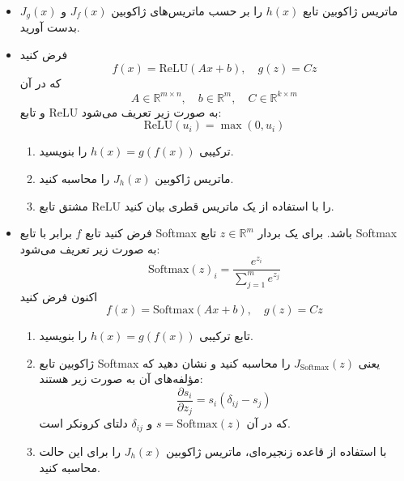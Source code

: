 \begin{itemize}
    \item[آ)] ماتریس ژاکوبین تابع $h(x)$ را بر حسب ماتریس‌های ژاکوبین $J_f(x)$ و $J_g(x)$ بدست آورید.
    
    \item[ب)] فرض کنید
    \begin{equation*}
        f(x) = \text{ReLU}(Ax + b), \quad g(z) = Cz
    \end{equation*}
    که در آن
    \begin{equation*}
        A \in \mathbb{R}^{m \times n}, \quad b \in \mathbb{R}^m, \quad C \in \mathbb{R}^{k \times m}
    \end{equation*}
    و تابع ReLU به صورت زیر تعریف می‌شود:
    \begin{equation*}
        \text{ReLU}(u_i) = \max(0, u_i)
    \end{equation*}
    \begin{enumerate}
        \item ترکیبی $h(x) = g(f(x))$ را بنویسید.
        \item ماتریس ژاکوبین $J_h(x)$ را محاسبه کنید.
        \item مشتق تابع ReLU را با استفاده از یک ماتریس قطری بیان کنید.
    \end{enumerate}

    \item[ج)] فرض کنید تابع $f$ برابر با تابع Softmax باشد. برای یک بردار $z \in \mathbb{R}^m$ تابع Softmax به صورت زیر تعریف می‌شود:
    \begin{equation*}
        \text{Softmax}(z)_i = \frac{e^{z_i}}{\sum_{j=1}^m e^{z_j}}
    \end{equation*}
    اکنون فرض کنید
    \begin{equation*}
        f(x) = \text{Softmax}(Ax + b), \quad g(z) = Cz
    \end{equation*}
    \begin{enumerate}
        \item تابع ترکیبی $h(x) = g(f(x))$ را بنویسید.
        \item ژاکوبین تابع Softmax یعنی $J_{\text{Softmax}}(z)$ را محاسبه کنید و نشان دهید که مؤلفه‌های آن به صورت زیر هستند:
        \begin{equation*}
            \frac{\partial s_i}{\partial z_j} = s_i(\delta_{ij} - s_j)
        \end{equation*}
        که در آن $s = \text{Softmax}(z)$ و $\delta_{ij}$ دلتای کرونکر است.
        \item با استفاده از قاعده زنجیره‌ای، ماتریس ژاکوبین $J_h(x)$ را برای این حالت محاسبه کنید.
    \end{enumerate}
\end{itemize}

